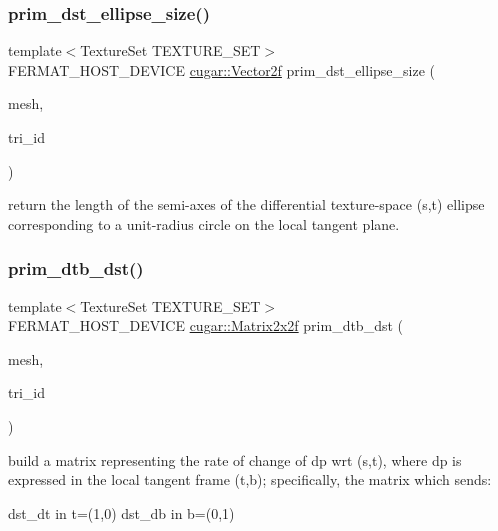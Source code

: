 \subsubsection{\texorpdfstring{prim\+\_\+dst\+\_\+ellipse\+\_\+size()}{prim\_dst\_ellipse\_size()}}
{\footnotesize\ttfamily template$<$Texture\+Set T\+E\+X\+T\+U\+R\+E\+\_\+\+S\+ET$>$ \\
F\+E\+R\+M\+A\+T\+\_\+\+H\+O\+S\+T\+\_\+\+D\+E\+V\+I\+CE \hyperlink{structcugar_1_1_vector}{cugar\+::\+Vector2f} prim\+\_\+dst\+\_\+ellipse\+\_\+size (\begin{DoxyParamCaption}\item[{const \hyperlink{struct_mesh_view}{Mesh\+View} \&}]{mesh,  }\item[{const uint32}]{tri\+\_\+id }\end{DoxyParamCaption})\hspace{0.3cm}{\ttfamily [inline]}}

return the length of the semi-\/axes of the differential texture-\/space (s,t) ellipse corresponding to a unit-\/radius circle on the local tangent plane. \mbox{\label{group___mesh_module_gac9ed44b788a4504434b1da004f987b8b}} 
\subsubsection{\texorpdfstring{prim\+\_\+dtb\+\_\+dst()}{prim\_dtb\_dst()}}
{\footnotesize\ttfamily template$<$Texture\+Set T\+E\+X\+T\+U\+R\+E\+\_\+\+S\+ET$>$ \\
F\+E\+R\+M\+A\+T\+\_\+\+H\+O\+S\+T\+\_\+\+D\+E\+V\+I\+CE \hyperlink{structcugar_1_1_matrix}{cugar\+::\+Matrix2x2f} prim\+\_\+dtb\+\_\+dst (\begin{DoxyParamCaption}\item[{const \hyperlink{struct_mesh_view}{Mesh\+View} \&}]{mesh,  }\item[{const uint32}]{tri\+\_\+id }\end{DoxyParamCaption})\hspace{0.3cm}{\ttfamily [inline]}}

build a matrix representing the rate of change of dp wrt (s,t), where dp is expressed in the local tangent frame (t,b); specifically, the matrix which sends\+:

dst\+\_\+dt in t=(1,0) dst\+\_\+db in b=(0,1) \mbox{\label{group___mesh_module_gae21ff4032c22a8cd5309479b4ce155b3}} 
